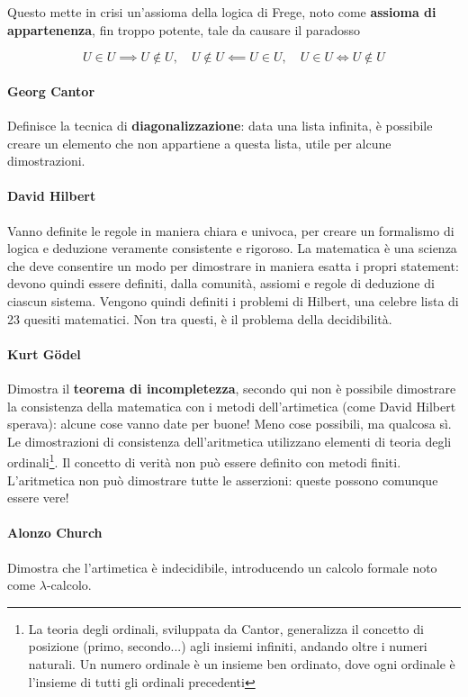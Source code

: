 	Questo mette in crisi un'assioma della logica di Frege, noto come \textbf{assioma di appartenenza}, fin troppo potente, tale da causare il paradosso 
	
	$$
	U \in U \implies U \notin U, \quad U \notin U \impliedby U \in U, \quad U \in U \Leftrightarrow U \notin U
	$$
	
	\paragraph{Georg Cantor} Definisce la tecnica di \textbf{diagonalizzazione}: data una lista infinita, è possibile creare un elemento che non appartiene a questa lista, utile per alcune dimostrazioni.
	
	\paragraph{David Hilbert} Vanno definite le regole in maniera chiara e univoca, per creare un formalismo di logica e deduzione veramente consistente e rigoroso. La matematica è una scienza che deve consentire un modo per dimostrare in maniera esatta i propri statement: devono quindi essere definiti, dalla comunità, assiomi e regole di deduzione di ciascun sistema. Vengono quindi definiti i problemi di Hilbert, una celebre lista di 23 quesiti matematici. Non tra questi, è il problema della decidibilità.
	
	\paragraph{Kurt Gödel} Dimostra il \textbf{teorema di incompletezza}, secondo qui non è possibile dimostrare la consistenza della matematica con i metodi dell'artimetica (come David Hilbert sperava): alcune cose vanno date per buone! Meno cose possibili, ma qualcosa sì. Le dimostrazioni di consistenza dell'aritmetica utilizzano elementi di teoria degli ordinali\footnote{La teoria degli ordinali, sviluppata da Cantor, generalizza il concetto di posizione (primo, secondo...) agli insiemi infiniti, andando oltre i numeri naturali. Un numero ordinale è un insieme ben ordinato, dove ogni ordinale è l'insieme di tutti gli ordinali precedenti}. Il concetto di verità non può essere definito con metodi finiti. L'aritmetica non può dimostrare tutte le asserzioni: queste possono comunque essere vere!
	
	\paragraph{Alonzo Church} Dimostra che l'artimetica è indecidibile, introducendo un calcolo formale noto come $\lambda$-calcolo.
	
